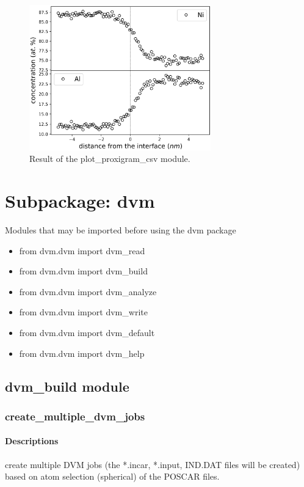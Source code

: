 \documentclass[12pt]{book}
\begin{document}
\begin{figure}[htbp]
\centering
\includegraphics[width=0.7\textwidth]{outputs_apt_concentration.pdf}
\caption{Result of the plot\_proxigram\_csv module.}
\label{fig:outputs_apt_concentration}
\end{figure}


\chapter{Subpackage: dvm}

Modules that may be imported before using the dvm package
\begin{itemize}
\item from dvm.dvm import dvm\_read
\item from dvm.dvm import dvm\_build
\item from dvm.dvm import dvm\_analyze
\item from dvm.dvm import dvm\_write
\item from dvm.dvm import dvm\_default
\item from dvm.dvm import dvm\_help
\end{itemize}

\section{dvm\_build module}
\subsection{create\_multiple\_dvm\_jobs}
\subsubsection{Descriptions}
create multiple DVM jobs (the *.incar, *.input, IND.DAT files will be created) based on atom selection (spherical) of the POSCAR files.
 
\end{document}
